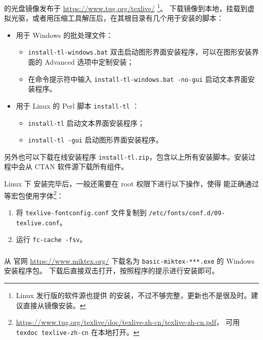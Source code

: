 \subsubsection{}

 的光盘镜像发布于 \url{https://www.tug.org/texlive/}%
\footnote{Linux 发行版的软件源也提供  的安装，不过不够完整，更新也不是很及时。建议直接从镜像安装。}。
下载镜像到本地，挂载到虚拟光驱，或者用压缩工具解压后，在其根目录有几个用于安装的脚本：
\begin{itemize}
  \item 用于 Windows 的批处理文件：
  \begin{itemize}
    \item \texttt{install-tl-windows.bat} 双击启动图形界面安装程序，可以在图形安装界面的 Advanced 选项中定制安装；
    \item 在命令提示符中输入 \texttt{install-tl-windows.bat -no-gui} 启动文本界面安装程序。
  \end{itemize}
  \item 用于 Linux 的 Perl 脚本 \texttt{install-tl} ：
  \begin{itemize}
    \item \texttt{install-tl} 启动文本界面安装程序；
    \item \texttt{install-tl -gui} 启动图形界面安装程序。
  \end{itemize}
\end{itemize}
另外也可以下载在线安装程序 \texttt{install-tl.zip}，包含以上所有安装脚本。安装过程中会从 CTAN 软件源下载所有组件。

Linux 下  安装完毕后，一般还需要在 root 权限下进行以下操作，使得  能正确通过 
等宏包使用字体\footnote{\url{https://www.tug.org/texlive/doc/texlive-zh-cn/texlive-zh-cn.pdf}，
可用 \texttt{texdoc texlive-zh-cn} 在本地打开。}：
\begin{enumerate}
  \item 将 \texttt{texlive-fontconfig.conf} 文件复制到 \texttt{/etc/fonts/conf.d/09-texlive.conf}。
  \item 运行 \texttt{fc-cache -fsv}。
\end{enumerate}

\subsubsection{}
从  官网 \url{https://www.miktex.org/} 下载名为 \texttt{basic-miktex-***.exe} 的 Windows 安装程序包。
下载后直接双击打开，按照程序的提示进行安装即可。

